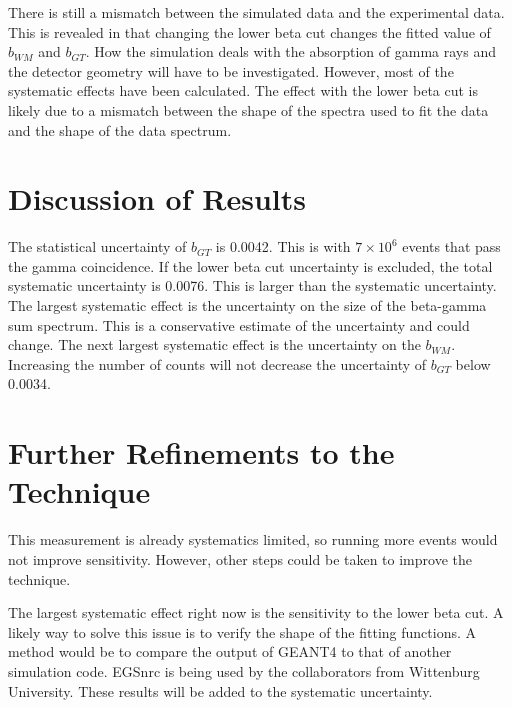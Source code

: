\documentclass[../MaxHughesThesis.tex]{subfiles}
\begin{document}
There is still a mismatch between the simulated data and the experimental data.
This is revealed in that changing the lower beta cut changes the fitted value of $b_{WM}$ and $b_{GT}$.
How the simulation deals with the absorption of gamma rays and the detector geometry will have to be investigated.
However, most of the systematic effects have been calculated.
The effect with the lower beta cut is likely due to a mismatch between the shape of the spectra used to fit the data and the shape of the data spectrum.

\section{Discussion of Results}

The statistical uncertainty of $b_{GT}$ is 0.0042.
This is with $7 \times 10^{6}$ events that pass the gamma coincidence.
If the lower beta cut uncertainty is excluded, the total systematic uncertainty is 0.0076.
This is larger than the systematic uncertainty.
The largest systematic effect is the uncertainty on the size of the beta-gamma sum spectrum.
This is a conservative estimate of the uncertainty and could change.
The next largest systematic effect is the uncertainty on the $b_{WM}$.
Increasing the number of counts will not decrease the uncertainty of $b_{GT}$ below 0.0034.


\section{Further Refinements to the Technique}
This measurement is already systematics limited, so running more events would not improve sensitivity.
However, other steps could be taken to improve the technique.

The largest systematic effect right now is the sensitivity to the lower beta cut. 
A likely way to solve this issue is to verify the shape of the fitting functions. 
A method would be to compare the output of GEANT4 to that of another simulation code.
EGSnrc is being used by the collaborators from Wittenburg University. 
These results will be added to the systematic uncertainty.
\end{document}
